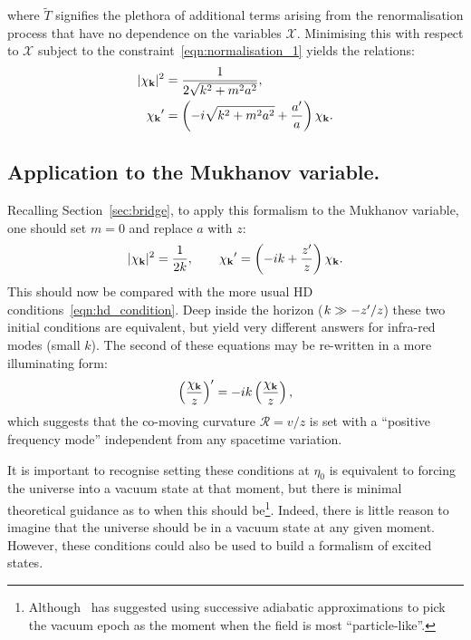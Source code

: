 where \(\tilde{T}\) signifies the plethora of additional terms arising from the renormalisation process that have no dependence on the variables \(\mathcal{X}\).
Minimising this with respect to \(\mathcal{X}\) subject to the constraint~\eqref{eqn:normalisation_1} yields the relations:
\begin{align}
  |\chi_{\mathbf{k}}|^2 &= \frac{1}{2\sqrt{k^2+m^2a^2}}, \\
  {{\chi_{\mathbf{k}}}^\prime} &= \left( -i \sqrt{k^2+m^2a^2} + \frac{{{a}^\prime}}{a} \right) \chi_{\mathbf{k}}.
  \label{eqn:rn_condition_m}
\end{align}


\subsection{Application to the Mukhanov variable.}
Recalling Section~\ref{sec:bridge}, to apply this formalism to the Mukhanov variable, one should set \(m=0\) and replace \(a\) with \(z\):
\begin{equation}        
  |\chi_{\mathbf{k}}|^2 = \frac{1}{2k},\qquad
  {{\chi_{\mathbf{k}}}^\prime} = \left( -i k + \frac{{{z}^\prime}}{z} \right) \chi_{\mathbf{k}}.
  \label{eqn:rn_condition}
\end{equation}
This should now be compared with the more usual HD conditions~\eqref{eqn:hd_condition}. Deep inside the horizon (\({k\gg -{{{z}^\prime}}/{z}}\)) these two initial conditions are equivalent, but yield very different answers for infra-red modes (small \(k\)).
The second of these equations may be re-written in a more illuminating form:
\begin{equation}
  {{\left( \frac{\chi_{\mathbf{k}}}{z} \right)}^\prime} = -i k \left( \frac{\chi_{\mathbf{k}}}{z} \right),
\end{equation}
which suggests that the co-moving curvature \(\mathcal{R}=v/z\) is set with a ``positive frequency mode'' independent from any spacetime variation.

It is important to recognise setting these conditions at \(\eta_0\) is equivalent to forcing the universe into a vacuum state at that moment, but there is minimal theoretical guidance as to when this should be\footnote{Although~\protect\cite{Lasenby2009} has suggested using successive adiabatic approximations to pick the vacuum epoch as the moment when the field is most ``particle-like''.}. Indeed, there is little reason to imagine that the universe should be in a vacuum state at any given moment. However, these conditions could also be used to build a formalism of excited states.

